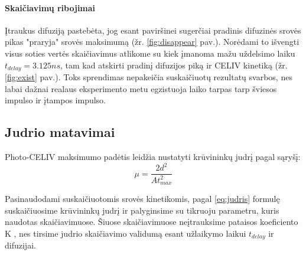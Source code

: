 \paragraph{Skaičiavimų ribojimai}
Įtraukus difuziją pastebėta, jog esant paviršinei sugerčiai pradinis difuzinės srovės pikas "praryja" srovės maksimumą (žr. \ref{fig:disappear} pav.).
Norėdami to išvengti visus soties vertės skaičiavimus atlikome su kiek įmanoma mažu uždelsimo laiku $t_{delay} = 3.125ns$, tam kad atskirti pradinį difuzijos piką ir CELIV kinetiką (žr. \ref{fig:exist} pav.). Toks sprendimas nepakeičia suskaičiuotų rezultatų svarbos, nes labai dažnai realaus eksperimento metu egzistuoja laiko tarpas tarp šviesos impulso ir įtampos impulso.

\subsection{Judrio matavimai}
Photo-CELIV maksimumo padėtis leidžia nustatyti krūvininkų judrį pagal sąryšį:
\begin{equation}
\label{eq:judris}
\mu = \frac{2d^2}{At_{max}^2}
\end{equation}

Pasinaudodami suskaičiuotomis srovės kinetikomis, pagal \eqref{eq:judris} formulę suskaičiuosime krūvininkų judrį ir palyginsime su tikruoju parametru, kuris naudotas skaičiavimuose. Šiuose skaičiavimuose neįtrauksime pataisos koeficiento K \cite{juška:155202}, nes tirsime judrio skaičiavimo validumą esant užlaikymo laikui $t_{delay}$ ir difuzijai.

